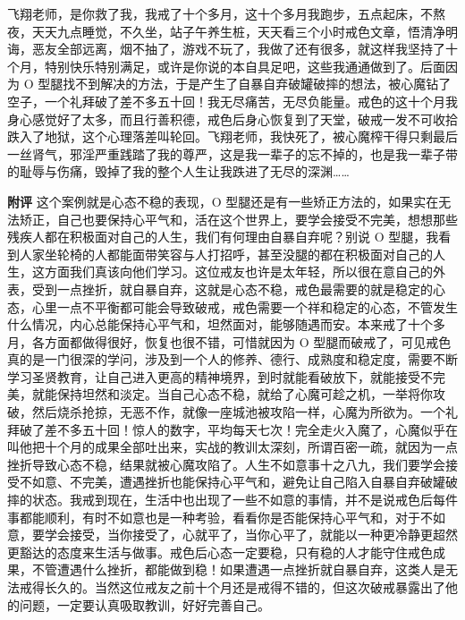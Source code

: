 \begin{case}
    飞翔老师，是你救了我，我戒了十个多月，这十个多月我跑步，五点起床，不熬夜，天天九点睡觉，不久坐，站子午养生桩，天天看三个小时戒色文章，悟清净明诲，恶友全部远离，烟不抽了，游戏不玩了，我做了还有很多，就这样我坚持了十个月，特别快乐特别满足，或许是你说的本自具足吧，这些我通通做到了。后面因为 O 型腿找不到解决的方法，于是产生了自暴自弃破罐破摔的想法，被心魔钻了空子，一个礼拜破了差不多五十回！我无尽痛苦，无尽负能量。戒色的这十个月我身心感觉好了太多，而且行善积德，戒色后身心恢复到了天堂，破戒一发不可收拾跌入了地狱，这个心理落差叫轮回。飞翔老师，我快死了，被心魔榨干得只剩最后一丝肾气，邪淫严重践踏了我的尊严，这是我一辈子的忘不掉的，也是我一辈子带的耻辱与伤痛，毁掉了我的整个人生让我跌进了无尽的深渊……

    \textbf{附评} 这个案例就是心态不稳的表现，O 型腿还是有一些矫正方法的，如果实在无法矫正，自己也要保持心平气和，活在这个世界上，要学会接受不完美，想想那些残疾人都在积极面对自己的人生，我们有何理由自暴自弃呢？别说 O 型腿，我看到人家坐轮椅的人都能面带笑容与人打招呼，甚至没腿的都在积极面对自己的人生，这方面我们真该向他们学习。这位戒友也许是太年轻，所以很在意自己的外表，受到一点挫折，就自暴自弃，这就是心态不稳，戒色最需要的就是稳定的心态，心里一点不平衡都可能会导致破戒，戒色需要一个祥和稳定的心态，不管发生什么情况，内心总能保持心平气和，坦然面对，能够随遇而安。本来戒了十个多月，各方面都做得很好，恢复也很不错，可惜就因为 O 型腿而破戒了，可见戒色真的是一门很深的学问，涉及到一个人的修养、德行、成熟度和稳定度，需要不断学习圣贤教育，让自己进入更高的精神境界，到时就能看破放下，就能接受不完美，就能保持坦然和淡定。当自己心态不稳，就给了心魔可趁之机，一举将你攻破，然后烧杀抢掠，无恶不作，就像一座城池被攻陷一样，心魔为所欲为。一个礼拜破了差不多五十回！惊人的数字，平均每天七次！完全走火入魔了，心魔似乎在叫他把十个月的成果全部吐出来，实战的教训太深刻，所谓百密一疏，就因为一点挫折导致心态不稳，结果就被心魔攻陷了。人生不如意事十之八九，我们要学会接受不如意、不完美，遭遇挫折也能保持心平气和，避免让自己陷入自暴自弃破罐破摔的状态。我戒到现在，生活中也出现了一些不如意的事情，并不是说戒色后每件事都能顺利，有时不如意也是一种考验，看看你是否能保持心平气和，对于不如意，要学会接受，当你接受了，心就平了，当你心平了，就能以一种更冷静更超然更豁达的态度来生活与做事。戒色后心态一定要稳，只有稳的人才能守住戒色成果，不管遭遇什么挫折，都能做到稳！如果遭遇一点挫折就自暴自弃，这类人是无法戒得长久的。当然这位戒友之前十个月还是戒得不错的，但这次破戒暴露出了他的问题，一定要认真吸取教训，好好完善自己。
\end{case}

